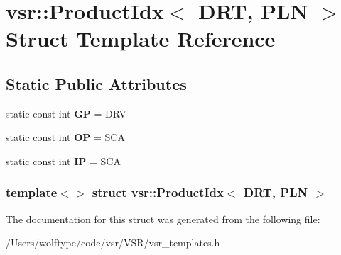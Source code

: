 \hypertarget{structvsr_1_1_product_idx_3_01_d_r_t_00_01_p_l_n_01_4}{\section{vsr\-:\-:Product\-Idx$<$ D\-R\-T, P\-L\-N $>$ Struct Template Reference}
\label{structvsr_1_1_product_idx_3_01_d_r_t_00_01_p_l_n_01_4}
}
\subsection*{Static Public Attributes}
\begin{DoxyCompactItemize}
\item 
\hypertarget{structvsr_1_1_product_idx_3_01_d_r_t_00_01_p_l_n_01_4_a5db3967adc241206cfaf32c982876bfa}{static const int {\bfseries G\-P} = D\-R\-V}\label{structvsr_1_1_product_idx_3_01_d_r_t_00_01_p_l_n_01_4_a5db3967adc241206cfaf32c982876bfa}

\item 
\hypertarget{structvsr_1_1_product_idx_3_01_d_r_t_00_01_p_l_n_01_4_a197dd216aa428560451bc29ad85dd55b}{static const int {\bfseries O\-P} = S\-C\-A}\label{structvsr_1_1_product_idx_3_01_d_r_t_00_01_p_l_n_01_4_a197dd216aa428560451bc29ad85dd55b}

\item 
\hypertarget{structvsr_1_1_product_idx_3_01_d_r_t_00_01_p_l_n_01_4_a83705d5f72c334076b36699a97e3c7a5}{static const int {\bfseries I\-P} = S\-C\-A}\label{structvsr_1_1_product_idx_3_01_d_r_t_00_01_p_l_n_01_4_a83705d5f72c334076b36699a97e3c7a5}

\end{DoxyCompactItemize}
\subsubsection*{template$<$$>$ struct vsr\-::\-Product\-Idx$<$ D\-R\-T, P\-L\-N $>$}



The documentation for this struct was generated from the following file\-:\begin{DoxyCompactItemize}
\item 
/\-Users/wolftype/code/vsr/\-V\-S\-R/vsr\-\_\-templates.\-h\end{DoxyCompactItemize}
